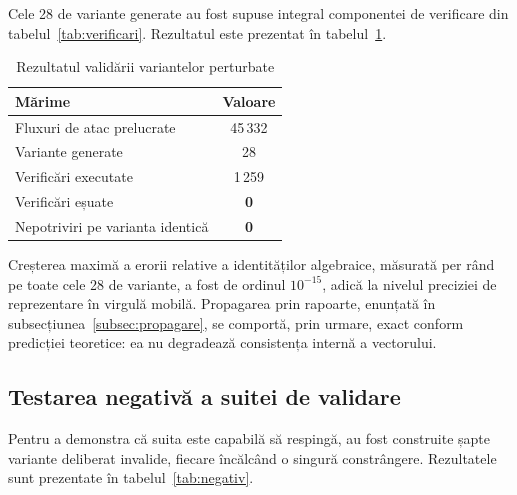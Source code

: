 Cele 28 de variante generate au fost supuse integral componentei de verificare din tabelul~\ref{tab:verificari}. Rezultatul este prezentat în tabelul~\ref{tab:validitate}.

\begin{table}[!ht]
    \caption{Rezultatul validării variantelor perturbate}
    \centering
    \begin{tabular}{|l|c|}
        \hline
        \textbf{Mărime} & \textbf{Valoare} \\
        \hline
        Fluxuri de atac prelucrate & 45\,332 \\
        \hline
        Variante generate & 28 \\
        \hline
        Verificări executate & 1\,259 \\
        \hline
        Verificări eșuate & \textbf{0} \\
        \hline
        Nepotriviri pe varianta identică & \textbf{0} \\
        \hline
    \end{tabular}
    \label{tab:validitate}
\end{table}

Creșterea maximă a erorii relative a identităților algebraice, măsurată per rând pe toate cele 28 de variante, a fost de ordinul $10^{-15}$, adică la nivelul preciziei de reprezentare în virgulă mobilă. Propagarea prin rapoarte, enunțată în subsecțiunea~\ref{subsec:propagare}, se comportă, prin urmare, exact conform predicției teoretice: ea nu degradează consistența internă a vectorului.

\subsection{Testarea negativă a suitei de validare}\label{subsec:negativ}

Pentru a demonstra că suita este capabilă să respingă, au fost construite șapte variante deliberat invalide, fiecare încălcând o singură constrângere. Rezultatele sunt prezentate în tabelul~\ref{tab:negativ}.

